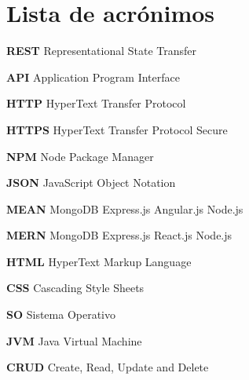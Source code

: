 \section*{Lista de acrónimos}

\noindent \textbf{REST} Representational State Transfer \newline \smallskip

\noindent \textbf{API} Application Program Interface \newline \smallskip 

\noindent \textbf{HTTP} HyperText Transfer Protocol \newline \smallskip

\noindent \textbf{HTTPS} HyperText Transfer Protocol Secure \newline \smallskip

\noindent \textbf{NPM} Node Package Manager \newline \smallskip

\noindent \textbf{JSON} JavaScript Object Notation \newline \smallskip

\noindent \textbf{MEAN} MongoDB Express.js Angular.js Node.js \newline \smallskip 

\noindent \textbf{MERN} MongoDB Express.js React.js Node.js \newline \smallskip

\noindent \textbf{HTML} HyperText Markup Language \newline \smallskip

\noindent \textbf{CSS} Cascading Style Sheets \newline \smallskip

\noindent \textbf{SO} Sistema Operativo \newline \smallskip

\noindent \textbf{JVM} Java Virtual Machine \newline \smallskip

\noindent \textbf{CRUD} Create, Read, Update and Delete \newline \smallskip